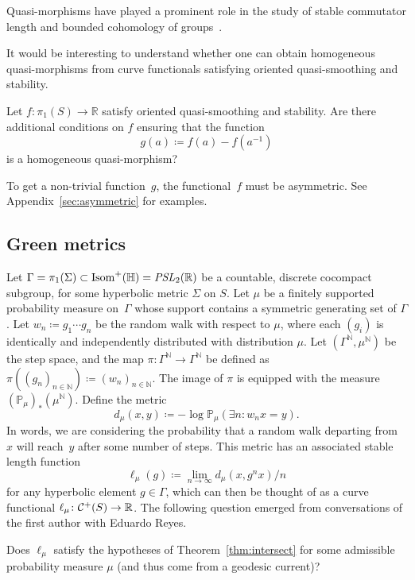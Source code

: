 Quasi-morphisms have played a prominent role in the study of stable commutator length and bounded cohomology of groups~\cite{Cal09:scl,Pic97:BoundedCohomology_currents}.

It would be interesting to understand whether one can obtain homogeneous quasi-morphisms from curve functionals satisfying oriented quasi-smoothing and stability.

\begin{question}
Let $f \colon \pi_1(S) \to \mathbb{R}$ satisfy oriented quasi-smoothing and stability.  
Are there additional conditions on $f$ ensuring that the function
\[
g(a) \coloneqq f(a) - f(a^{-1})
\]
is a homogeneous quasi-morphism?
\end{question} 

To get a non-trivial function~$g$, the functional~$f$ must be
asymmetric. See Appendix~\ref{sec:asymmetric} for examples.


\subsection{Green metrics}
\label{subsec:green}
Let $\Gamma=\pi_1(\Sigma) \subset \operatorname{Isom}^+(\mathbb{H})=\operatorname{\mathit{PSL}}_2(\mathbb{R})$ be a countable, discrete cocompact subgroup, for some hyperbolic metric $\Sigma$ on $S$.
Let $\mu$ be a finitely supported probability measure on~$\Gamma$
whose support contains a symmetric generating set of $\Gamma$.
Let $w_n \coloneqq g_1 \cdots g_n$ be the random walk with respect to $\mu$, where each $(g_i)$ is identically and independently distributed with distribution $\mu$. Let $(\Gamma^{\mathbb{N}}, \mu^{\mathbb{N}})$ be the step space, and the map $\pi \colon \Gamma^{\mathbb{N}} \to \Gamma^{\mathbb{N}}$ be defined as $\pi((g_n)_{n \in \mathbb{N}}) \coloneqq (w_n)_{n \in \mathbb{N}}$. The image of $\pi$ is equipped with the measure $(\mathbb{P}_{\mu})_*(\mu^{\mathbb{N}})$.
Define the metric
\[ d_{\mu}(x,y) \coloneqq - \log \mathbb{P}_{\mu}(\exists n : w_n x =y).\]
In words, we are considering the probability that a random walk
departing from $x$ will reach~$y$ after some number of steps.
This metric has an associated stable length
function
\[
  \ell_{\mu}(g) \coloneqq \lim_{n\to\infty} d_{\mu}(x, g^n x)/n
\]
for any hyperbolic element $g \in \Gamma$, which can then be thought of as a curve functional $\ell_{\mu} \colon \mathcal{C}^+(S) \to \mathbb{R}$. The following question emerged from conversations of the first author with Eduardo Reyes.

\begin{question}
Does $\ell_{\mu}$ satisfy the hypotheses of
Theorem~\ref{thm:intersect} for some admissible probability measure $\mu$ (and thus come from a geodesic current)?
\label{q:green-smoothing}
\end{question}


